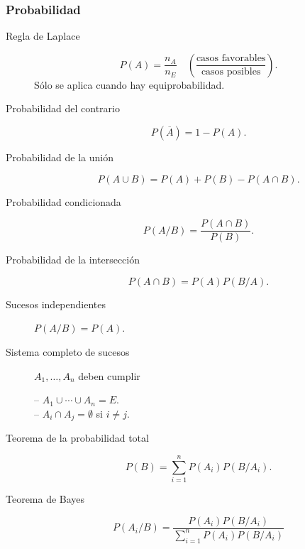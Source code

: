 \documentclass[a4paper,dvips]{article}
\newlength{\mylength}
\newenvironment{marco}{
	\setlength{\fboxsep}{5pt}
	\setlength{\mylength}{\textwidth}
	\addtolength{\mylength}{-2\fboxsep}
	\addtolength{\mylength}{-2\fboxrule}
	\noindent
	\begin{Sbox}
	\begin{minipage}{\mylength}
	\setlength{\abovedisplayskip}{3pt}
	\setlength{\belowdisplayskip}{3pt}
}
{
	\end{minipage}
	\end{Sbox}
	\fbox{\TheSbox}
}
\begin{document}
\begin{marco}
\begin{multicols}{2}
\subsubsection*{Probabilidad}
\begin{description}
\item [Regla de Laplace] \[P(A)=\dfrac{n_A}{n_E}\quad \left(\dfrac{\textrm{casos favorables}}{\textrm{casos
posibles}}\right).\] Sólo se aplica cuando hay equiprobabilidad.
\item [Probabilidad del contrario] \[P(\overline A)=1-P(A).\]
\item [Probabilidad de la unión] \[P(A\cup B)=P(A)+P(B)-P(A\cap B).\]
\item [Probabilidad condicionada] \[P(A/B)=\dfrac{P(A\cap B)}{P(B)}.\]
\item [Probabilidad de la intersección] \[P(A\cap B)=P(A)P(B/A).\]
\item [Sucesos independientes] $P(A/B)=P(A)$.
\item [Sistema completo de sucesos] $A_1,\ldots,A_n$ deben cumplir

-- $A_1\cup\cdots\cup A_n=E$.\\
-- $A_i\cap A_j=\emptyset$ si $i\neq j$.

\item [Teorema de la probabilidad total]
\[ P(B)=\sum_{i=1}^{n}P(A_i)P(B/A_i).\]
\item [Teorema de Bayes]
\[P(A_i/B)=\dfrac{P(A_i)P(B/A_i)}{\sum_{i=1}^{n}P(A_i)P(B/A_i)}\]
\end{description}
\end{multicols}
\end{marco}
\end{document}
